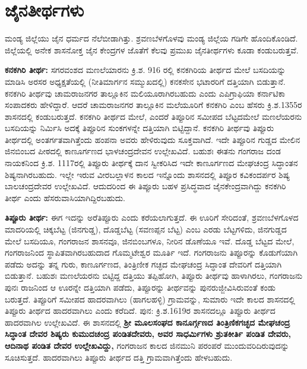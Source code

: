 \section*{ಜೈನತೀರ್ಥಗಳು}

ಮಂಡ್ಯ ಜಿಲ್ಲೆಯು ಜೈನ ಧರ್ಮದ ನೆಲೆಬೀಡಾಗಿತ್ತು. ಶ್ರವಣಬೆಳಗೊಳವು ಮಂಡ್ಯ ಜಿಲ್ಲೆಯ ಗಡಿಗೇ ಹೊಂದಿಕೊಂಡಿದೆ. ಜಿಲ್ಲೆಯಲ್ಲಿ ಅನೇಕ ಶಾಸನೋಕ್ತ ಜೈನ ಕೇಂದ್ರಗಳ ಜೊತೆಗೆ ಕೆಲವು ಪ್ರಮುಖ ಜೈನತೀರ್ಥಗಳು ಕೂಡಾ ಕಂಡುಬರುತ್ತವೆ.

\textbf{ಕನಕಗಿರಿ ತೀರ್ಥ:} ಸಗರವಂಶದ ಮಣಲೆಯಾರನು ಕ್ರಿ.ಶ. 916 ರಲ್ಲಿ ಕನಕಗಿರಿಯ ತೀರ್ಥದ ಮೇಲೆ ಬಸದಿಯನ್ನು ಮಾಡಿಸಿ ಅರಸರ ಅಧ್ಯಕ್ಷತೆಯಲ್ಲಿ (ನೀತಿಮಾರ್ಗನ ಸಮ್ಮುಖದಲ್ಲಿ) ಕನಕಸೇನ ಭಟಾರರಿಗೆ ದತ್ತಿಯಾಗಿ ಬಿಡುತ್ತಾನೆ. ಕನಕಗಿರಿ ತೀರ್ಥವು ಚಾಮರಾಜನಗರ ತಾಲ್ಲೂಕಿನ ಮಲಿಯೂರಾಗಿರಬಹುದು ಎಂದು ಎಪಿಗ್ರಾಫಿಯಾ ಕರ್ನಾಟಿಕಾ ಸಂಪಾದಕರು ಹೇಳಿದ್ದಾರೆ. ಆದರೆ ಚಾಮರಾಜನಗರ ತಾಲ್ಲೂಕಿನ ಮಲೆಯೂರಿಗೆ ಕನಕಗಿರಿ ಎಂಬ ಹೆಸರು ಕ್ರಿ.ಶ.1355ರ ಶಾಸನದಲ್ಲಿ ಕಂಡುಬರುತ್ತದೆ. ಕನಕಗಿರಿ ತೀರ್ಥದ ಮೇಲೆ, ಎಂದರೆ ತಿಪ್ಪೂರಿನ ಸಮೀಪದ ಬೆಟ್ಟದಮೇಲೆ ಮಣಲೆಯರನು ಬಸದಿಯನ್ನು ನಿರ್ಮಿಸಿ ಅದಕ್ಕೆ ತಿಪ್ಪೂರಿನ ಸುಂಕಗಳನ್ನೇ ದತ್ತಿಯಾಗಿ ಬಿಟ್ಟಿದ್ದಾನೆ. ಕನಕಗಿರಿ ತೀರ್ಥವು ತಿಪ್ಪೂರು ತೀರ್ಥದಲ್ಲಿ ಅಂತರ್ಗತವಾಗಿತ್ತೆಂದು ಹಂಪನಾ ಅವರು ಹೇಳಿರುವುದು ಸೂಕ್ತವಾಗಿದೆ. ಇದೇ ತಿಪ್ಪೂರಿನ ಗುಡ್ಡದ ಮೇಲಿನ ಜಿನಬಿಂಬದ ಪೀಠದಲ್ಲಿ ಕಾಣೂರ್ಗಣದ ಭಾಳಚಂದ್ರದೇವನ ಉಲ್ಲೇಖವಿದೆ. ಬಹುಶಃ ಈತನು ಗಂಗರಾಜ ದಂಡ ನಾಯಕನಿಂದ ಕ್ರಿ.ಶ. 1117ರಲ್ಲಿ ತಿಪ್ಪೂರು ತೀರ್ಥಕ್ಕೆ ದಾನ ಸ್ವೀಕರಿಸಿದ ಇದೇ ಕಾಣೂರ್ಗಣದ ಮೇಘಚಂದ್ರ ಸಿದ್ಧಾಂತನ ಶಿಷ್ಯನಾಗಿರಬಹುದು. ಇಲ್ಲೇ ಇರುವ ವೀರಬಲ್ಲಾಳನ ಕಾಲದ ಇನ್ನೊಂದು ಶಾಸನದಲ್ಲಿ ತಿಪ್ಪೂರ ಕವಿಕಂದರ್ಪರ ಶಿಷ್ಯ ಬಾಲಚಂದ್ರದೇವರ ಉಲ್ಲೇಖವಿದೆ. ಆದುದರಿಂದ ಈ ತಿಪ್ಪೂರು ಬಹಳ ಪ್ರಸಿದ್ಧವಾದ ಜೈನಕೇಂದ್ರವಾಗಿದ್ದು ಕನಕಗಿರಿ ತೀರ್ಥ ಎಂದು ಹೆಸರುವಾಸಿಯಾಗಿದ್ದಿರಬಹುದು.

\textbf{ತಿಪ್ಪೂರು ತೀರ್ಥ:} ಈಗ ಇದನ್ನು ಅರೆತಿಪ್ಪೂರು ಎಂದು ಕರೆಯಲಾಗುತ್ತದೆ. ಈ ಊರಿಗೆ ಸೇರಿದಂತೆ, ಶ್ರವಣಬೆಳಗೊಳದ ಮಾದರಿಯಲ್ಲಿ ಚಿಕ್ಕಬೆಟ್ಟ (ಜಿನಗುಡ್ಡ), ದೊಡ್ಡಬೆಟ್ಟ (ಸವಣಪ್ಪನ ಬೆಟ್ಟ) ಎಂಬ ಎರಡು ಬೆಟ್ಟಗಳಿದು, ಜಿನಗುಡ್ಡದ ಮೇಲೆ ಬಸದಿಯೂ, ಗಂಗರಾಜನ ಶಾಸನವೂ, ಜಿನಬಿಂಬಗಳೂ, ನೀರಿನ ಡೊಣೆಯೂ ಇವೆ. ದೊಡ್ಡ ಬೆಟ್ಟದ ಮೇಲೆ, ಗಂಗರಾಜನಿಂದ ಸ್ಥಾಪಿತವಾಗಿರಬಹುದಾದ ಗೊಮ್ಮಟೇಶ್ವರ ಮೂರ್ತಿ ಇದೆ. ಗಂಗರಾಜನು ತಿಪ್ಪೂರನ್ನು ಕೊಡುಗೆಯಾಗಿ ಪಡೆದು ಅದನ್ನು ತನ್ನ ಗುರು, ಕಾಣೂರ್ಗಣದ, ತಿಂತ್ರಿಣೀಕ ಗಚ್ಛದ ಮೇಘಚಂದ್ರ ಸಿದ್ಧಾಂತ ದೇವರಿಗೆ ದತ್ತಿಯಾಗಿ ಬಿಡುತ್ತಾನೆ. ಬಹುಶಃ ಮಣಲೆಯರನು ಬಿಟ್ಟಿದ್ದ ದತ್ತಿಯು ತಪ್ಪಿಹೋಗಿ, ತಿಪ್ಪೂರು ತೀರ್ಥವು ಹಾಳಾಗಿರಲು, ಗಂಗರಾಜನು ಪುನಃ ರಾಜನಿಂದ ಆ ಊರನ್ನೇ ದತ್ತಿಯಾಗಿ ಪಡೆದು, ತಿಪ್ಪೂರನ್ನು ತೀರ್ಥವನ್ನು ಪುನರುಜ್ಜೀವಿಸಿರುವಂತೆ ಕಂಡು ಬರುತ್ತದೆ. ತಿಪ್ಪೂರಿಗೆ ಸಮೀಪದ ಹಾದರವಾಗಿಲು (ಹಾಗಲಹಳ್ಳಿ) ಗ್ರಾಮವನ್ನು, ಸುಮಾರು ಇದೇ ಕಾಲದ ಶಾಸನದಲ್ಲಿ ತಿಪ್ಪೂರು ತೀರ್ಥದ ಹಾದರವಾಗಿಲು ಎಂದು ಕರೆದಿದೆ. ಪುನ: ಕ್ರಿ.ಶ.1619ರ ಶಾಸನದಲ್ಲೂ ತಿಪ್ಪೂರು ತೀರ್ಥದ ಹಾದರವಾಗಿಲ ಉಲ್ಲೇಖವಿದೆ. ಈ ಶಾಸನದಲ್ಲಿ \textbf{ಶ‍್ರೀ ಮೂಲಸಂಘದ ಕಾನೂರ್ಗ್ಗಣದ ತಿಂತ್ರಿಣಿಕಗಚ್ಛದ ಮೇಘಚಂದ್ರ ಸಿದ್ಧಾಂತ ದೇವರ ಶಿಷ್ಯರು ಕುಮುದಚಂದ್ರ ಪಂಡಿತದೇವರು, ಅವರ ಸಾಧರ್ಮಿಗಳು ಶ್ರುತಕೀರ್ತಿ ಪಂಡಿತ ದೇವರು, ಆದಿನಾಥ ಪಂಡಿತ ದೇವರ ಉಲ್ಲೇಖವಿದ್ದು,} ಗಂಗರಾಜನ ಕಾಲದ ಜಿನಮುನಿ ಪರಂಪರೆ ಮುಂದುವರಿದಿರುವುದನ್ನು ಸೂಚಿಸುತ್ತದೆ. ಹಾದರವಾಗಿಲು ತಿಪ್ಪೂರು ತೀರ್ಥದ ದತ್ತಿ ಗ್ರಾಮವಾಗಿತ್ತೆಂದು ಹೇಳಬಹುದು.


